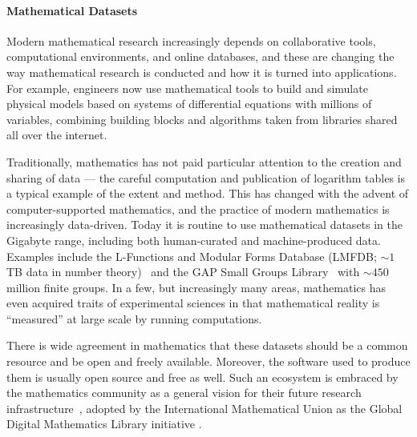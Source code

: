\paragraph{Mathematical Datasets}

Modern mathematical research increasingly depends on collaborative tools, computational environments, and online databases, and these are changing the way mathematical research is conducted and how it is turned into applications.
For example, engineers now use mathematical tools to build and simulate physical models based on systems of differential equations with millions of variables, combining building blocks and algorithms taken from libraries shared all over the internet.

Traditionally, mathematics has not paid particular attention to the creation and sharing of data --- the careful computation and publication of logarithm tables is a typical example of the extent and method.
This has changed with the advent of computer-supported mathematics, and the practice of modern mathematics is increasingly data-driven.
Today it is routine to use mathematical datasets in the Gigabyte range, including both human-curated and machine-produced data.
Examples include the L-Functions and Modular Forms Database (LMFDB; $\sim 1$ TB data in number theory)~\cite{Cremona:LMFDB16,lmfdb:on} and the GAP Small Groups Library~\cite{GapSmallGroups:on} with $\sim 450$ million finite groups.  
In a few, but increasingly many areas, mathematics has even acquired traits of experimental sciences in that mathematical reality is ``measured'' at large scale by running computations.

There is wide agreement in mathematics that these datasets should be a common resource and be open and freely available.
Moreover, the software used to produce them is usually open source and free as well.
Such an ecosystem is embraced by the mathematics community as a general vision for their future research infrastructure~\cite{NAS14}, adopted by the International Mathematical Union as the Global Digital Mathematics Library initiative \cite{GDML:on}.

